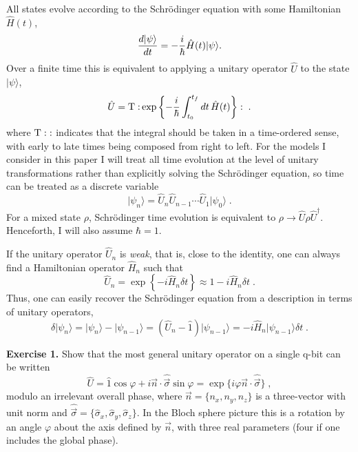 \documentclass[12pt]{article}
\def\ket#1{{| #1 \rangle}}
\def\sx{{\hat\sigma_x}}
\def\sy{{\hat\sigma_y}}
\def\sz{{\hat\sigma_z}}
\def\svec{{\hat{\vec\sigma}}}
\def\nvec{{\vec n}}
\def\id{{\hat 1}}
\def\H{{\hat H}}
\def\U{{\hat U}}
\def\Udag{{\hat U^\dagger}}
\begin{document}
All states evolve according to the Schr\"odinger equation with some
Hamiltonian $\H(t)$,
\begin{equation}
{d\ket\psi\over dt} = - {i\over\hbar} \H(t) \ket\psi.
\label{schrodinger}
\end{equation}
Over a finite time this is equivalent to applying a unitary operator
$\U$ to the state $\ket\psi$,
\begin{equation}
\U = {\rm T:} \exp \left\{ -{i\over\hbar} \int_{t_0}^{t_f} dt\, \H(t)
  \right\} : \;.
\end{equation}
where ${\rm T:}:$ indicates that the integral should be taken in a
time-ordered sense, with early to late times being composed from right
to left.  For the models I consider in this paper I will treat all time
evolution at the level of unitary transformations rather than explicitly
solving the Schr\"odinger equation, so time can be treated as a discrete
variable
\begin{equation}
\ket{\psi_n} = \U_n \U_{n-1} \cdots \U_1 \ket{\psi_0} \;.
\end{equation}
For a mixed state $\rho$, Schr\"odinger time evolution is
equivalent to $\rho \rightarrow \U \rho \Udag$.  Henceforth, I will
also assume $\hbar=1$.

If the unitary operator $\U_n$ is {\it weak}, that is, close to the
identity, one can always find a Hamiltonian operator $\H_n$ such that
\begin{equation}
\U_n = \exp\left\{ -i \H_n \delta t \right\} \approx 1 - i \H_n \delta t \;.
\end{equation}
Thus, one can easily recover the Schr\"odinger equation from a description
in terms of unitary operators,
\begin{equation}
\delta\ket{\psi_n} = \ket{\psi_n} - \ket{\psi_{n-1}}
  = (\U_n - \id)\ket{\psi_{n-1}} = - i\H_n\ket{\psi_{n-1}} \delta t \;.
\end{equation}

\medskip\noindent
{\bf Exercise 1.}  Show that the most general unitary operator on a single
q-bit can be written
\begin{equation}
\U = \id\cos\varphi + i\nvec\cdot\svec\sin\varphi
  = \exp\{ i\varphi\nvec\cdot\svec \}\;,
\end{equation}
modulo an irrelevant overall phase,
where $\nvec=\{n_x,n_y,n_z\}$ is a three-vector with unit norm and
$\svec = \{\sx,\sy,\sz\}$.  In the Bloch sphere picture this is a rotation
by an angle $\varphi$ about the axis defined by $\nvec$, with three real
parameters (four if one includes the global phase).
\medskip
\end{document}
